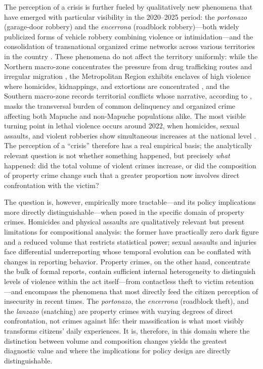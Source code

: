 \documentclass[pdflatex,sn-basic]{sn-jnl}
\begin{document}
The perception of a crisis is further fueled by qualitatively new phenomena that have emerged with particular visibility in the 2020--2025 period: the \textit{portonazo} (garage-door robbery) and the \textit{encerrona} (roadblock robbery)---both widely publicized forms of vehicle robbery combining violence or intimidation---and the consolidation of transnational organized crime networks across various territories in the country \citep{greene2023,bravo2024}. These phenomena do not affect the territory uniformly: while the Northern macro-zone concentrates the pressure from drug trafficking routes and irregular migration \citep{bravo2024}, the Metropolitan Region exhibits enclaves of high violence where homicides, kidnappings, and extortions are concentrated \citep{dammert2025}, and the Southern macro-zone records territorial conflicts whose narrative, according to \citet{izquierdo2024}, masks the transversal burden of common delinquency and organized crime affecting both Mapuche and non-Mapuche populations alike. The most visible turning point in lethal violence occurs around 2022, when homicides, sexual assaults, and violent robberies show simultaneous increases at the national level \citep{crespo2023}. The perception of a ``crisis'' therefore has a real empirical basis; the analytically relevant question is not whether something happened, but precisely \textit{what} happened: did the total volume of violent crimes increase, or did the composition of property crime change such that a greater proportion now involves direct confrontation with the victim?

The question is, however, empirically more tractable---and its policy implications more directly distinguishable---when posed in the specific domain of property crimes. Homicides and physical assaults are qualitatively relevant but present limitations for compositional analysis: the former have practically zero dark figure and a reduced volume that restricts statistical power; sexual assaults and injuries face differential underreporting whose temporal evolution can be conflated with changes in reporting behavior. Property crimes, on the other hand, concentrate the bulk of formal reports, contain sufficient internal heterogeneity to distinguish levels of violence within the act itself---from contactless theft to victim retention---and encompass the phenomena that most directly feed the citizen perception of insecurity in recent times. The \textit{portonazo}, the \textit{encerrona} (roadblock theft), and the \textit{lanzazo} (snatching) are property crimes with varying degrees of direct confrontation, not crimes against life: their massification is what most visibly transforms citizens' daily experiences. It is, therefore, in this domain where the distinction between volume and composition changes yields the greatest diagnostic value and where the implications for policy design are directly distinguishable.
\end{document}
